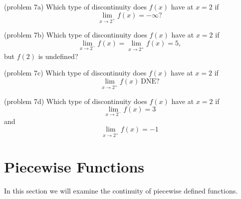 \documentclass{ximera}
\begin{document}

\begin{problem}(problem 7a)
Which type of discontinuity does $f(x)$ have at $x=2$ if
\[
\lim_{x \to 2^+} f(x) = -\infty?
\]

\begin{multipleChoice}
\end{multipleChoice}
\end{problem}

\begin{problem}(problem 7b)
Which type of discontinuity does $f(x)$ have at $x=2$ if
\[
\lim_{x \to 2^-} f(x) = \lim_{x \to 2^+} f(x) = 5,
\]
but $f(2)$ is undefined?
\begin{multipleChoice}
\end{multipleChoice}
\end{problem}

\begin{problem}(problem 7c)
Which type of discontinuity does $f(x)$ have at $x=2$ if
\[
\lim_{x \to 2^+} f(x) \ \text{DNE}?
\]

\begin{multipleChoice}
\end{multipleChoice}
\end{problem}

\begin{problem}(problem 7d)
Which type of discontinuity does $f(x)$ have at $x=2$ if
\[
\lim_{x \to 2^-} f(x) = 3
\]
and
\[
\lim_{x \to 2^+} f(x) = -1
\]
\begin{multipleChoice}
\end{multipleChoice}
\end{problem}



\section{Piecewise Functions}


In this section we will examine the continuity of piecewise defined functions.
\end{document}
